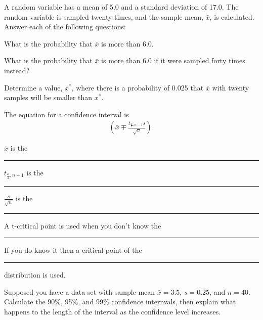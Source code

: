 \begin{problem}
  \item A random variable has a mean of 5.0 and a standard deviation
    of 17.0. The random variable is sampled twenty times, and the
    sample mean, $\bar{x}$, is calculated. Answer each of the
    following questions:
    \begin{subproblem}
      \item What is the probability that $\bar{x}$ is more than 6.0.

        \vfill

      \item What is the probability that $\bar{x}$ is more than 6.0 if
        it were sampled forty times instead?

        \vfill

      \item Determine a value, $x^*$, where there is a probability of
        0.025 that $\bar{x}$ with twenty samples will be smaller than
        $x^*$.

        \vfill

    \end{subproblem}

    \clearpage

  \item The equation for a confidence interval is 
    \begin{eqnarray*}
      \left( \bar{x} \mp \frac{t_{\frac{\alpha}{2},n-1}s}{\sqrt{n}}\right).
    \end{eqnarray*} 

    \begin{subproblem}
    \item $\bar{x}$ is the \rule{3cm}{0.2mm}   
    \item $t_{\frac{\alpha}{2},n-1}$ is the \rule{3cm}{0.2mm}  
    \item $\frac{s}{\sqrt{n}}$ is the \rule{3cm}{0.2mm} 
    \item A t-critical point is used when you don't know the
      \rule{3cm}{0.2mm}
    \item If you do know it then a critical
      point of the \rule{3cm}{0.2mm} distribution is used.
    \end{subproblem}

  \item Supposed you have a data set with sample mean $\bar{x} = 3.5$,
    $s=0.25$, and $n=40$. Calculate the 90\%, 95\%, and 99\%
    confidence internvals, then explain what happens to the length of
    the interval as the confidence level increases.


\end{problem}
